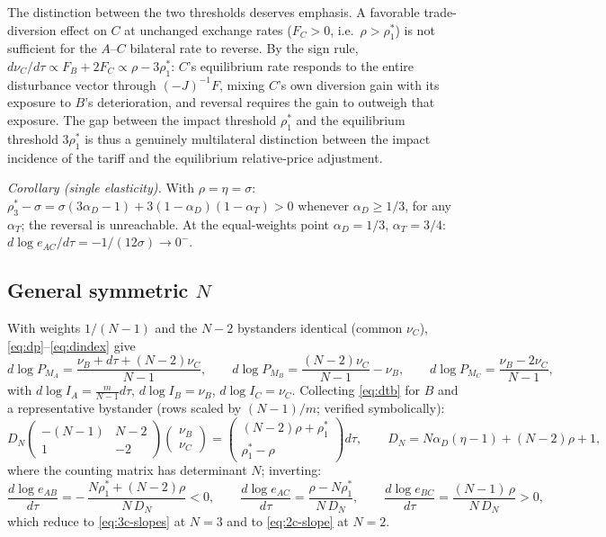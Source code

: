 \documentclass[11pt]{article}
\begin{document}
\noindent The distinction between the two thresholds deserves emphasis. A favorable trade-diversion effect on $C$ at unchanged exchange rates ($F_C > 0$, i.e.\ $\rho > \rho_1^*$) is not sufficient for the $A$--$C$ bilateral rate to reverse. By the sign rule, $d\nu_C/d\tau \propto F_B + 2F_C \propto \rho - 3\rho_1^*$: $C$'s equilibrium rate responds to the entire disturbance vector through $(-J)^{-1}F$, mixing $C$'s own diversion gain with its exposure to $B$'s deterioration, and reversal requires the gain to outweigh that exposure. The gap between the impact threshold $\rho_1^*$ and the equilibrium threshold $3\rho_1^*$ is thus a genuinely multilateral distinction between the impact incidence of the tariff and the equilibrium relative-price adjustment.

\emph{Corollary (single elasticity).} With $\rho = \eta = \sigma$: $\rho_3^* - \sigma = \sigma(3\alpha_D - 1) + 3(1-\alpha_D)(1-\alpha_T) > 0$ whenever $\alpha_D \geq 1/3$, for any $\alpha_T$; the reversal is unreachable. At the equal-weights point $\alpha_D = 1/3$, $\alpha_T = 3/4$: $d\log e_{AC}/d\tau = -1/(12\sigma) \to 0^-$.

\subsection{General symmetric $N$}

With weights $1/(N-1)$ and the $N-2$ bystanders identical (common $\nu_C$), \eqref{eq:dp}--\eqref{eq:dindex} give
\begin{equation}
d\log P_{M_A} = \frac{\nu_B + d\tau + (N-2)\nu_C}{N-1},
\qquad
d\log P_{M_B} = \frac{(N-2)\nu_C}{N-1} - \nu_B,
\qquad
d\log P_{M_C} = \frac{\nu_B - 2\nu_C}{N-1},
\label{eq:N-indices}
\end{equation}
with $d\log I_A = \tfrac{m}{N-1}d\tau$, $d\log I_B = \nu_B$, $d\log I_C = \nu_C$. Collecting \eqref{eq:dtb} for $B$ and a representative bystander (rows scaled by $(N-1)/m$; verified symbolically):
\begin{equation}
D_N
\begin{pmatrix} -(N-1) & N-2 \\ 1 & -2 \end{pmatrix}
\begin{pmatrix} \nu_B \\ \nu_C \end{pmatrix}
=
\begin{pmatrix} (N-2)\rho + \rho_1^* \\ \rho_1^* - \rho \end{pmatrix} d\tau ,
\qquad
D_N = N\alpha_D(\eta-1) + (N-2)\rho + 1 ,
\label{eq:N-system}
\end{equation}
where the counting matrix has determinant $N$; inverting:
\begin{equation}
\frac{d\log e_{AB}}{d\tau}
= -\,\frac{N\rho_1^* + (N-2)\rho}{N\, D_N} < 0,
\qquad
\frac{d\log e_{AC}}{d\tau}
= \frac{\rho - N\rho_1^*}{N\, D_N},
\qquad
\frac{d\log e_{BC}}{d\tau}
= \frac{(N-1)\,\rho}{N\, D_N} > 0 ,
\label{eq:N-slopes}
\end{equation}
which reduce to \eqref{eq:3c-slopes} at $N = 3$ and to \eqref{eq:2c-slope} at $N = 2$.
\end{document}
